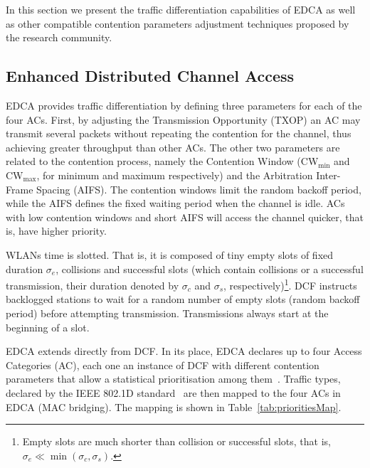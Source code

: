 \documentclass[a4paper]{article}
\begin{document}
In this section we present the traffic differentiation capabilities of EDCA as well as other compatible contention parameters adjustment techniques proposed by the research community.

\subsection{Enhanced Distributed Channel Access}\label{EDCA}
EDCA provides traffic differentiation by defining three parameters for each of the four ACs. First, by adjusting the Transmission Opportunity (TXOP) an AC may transmit several packets without repeating the contention for the channel, thus achieving greater throughput than other ACs. The other two parameters are related to the contention process, namely the Contention Window (CW$_{\min}$ and CW$_{\max}$, for minimum and maximum respectively) and the Arbitration Inter-Frame Spacing (AIFS). The contention windows limit the random backoff period, while the AIFS defines the fixed waiting period when the channel is idle. ACs with low contention windows and short AIFS will access the channel quicker, that is, have higher priority.

WLANs time is slotted. That is, it is composed of tiny empty slots of fixed duration $\sigma_{e}$, collisions and successful slots (which contain collisions or a successful transmission, their duration denoted by $\sigma_{c}$ and $\sigma_{s}$, respectively)\footnote{Empty slots are much shorter than collision or successful slots, that is, $\sigma_{e}\ll\min(\sigma_{c},\sigma_{s})$.}. DCF instructs backlogged stations to wait for a random number of empty slots (random backoff period) before attempting transmission. Transmissions always start at the beginning of a slot.

EDCA extends directly from DCF. In its place, EDCA declares up to four Access Categories (AC), each one an instance of DCF with different contention parameters that allow a statistical prioritisation among them~\cite{perahia2013next}. Traffic types, declared by the IEEE 802.1D standard~\cite{8021d} are then mapped to the four ACs in EDCA (MAC bridging). The mapping is shown in Table~\ref{tab:prioritiesMap}.
\end{document}
